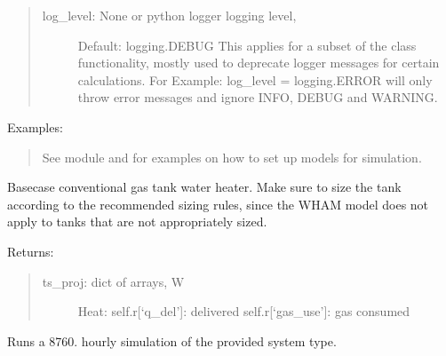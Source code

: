 \documentclass[letterpaper,10pt,english,openany]{sphinxmanual}
\begin{document}
\begin{fulllineitems}
\begin{quote}
\begin{description}
\item[{log\_level: None or python logger logging level,}] \leavevmode
Default: logging.DEBUG
This applies for a subset of the class functionality, mostly
used to deprecate logger messages for certain calculations.
For Example: log\_level = logging.ERROR will only throw error
messages and ignore INFO, DEBUG and WARNING.

\end{description}
\end{quote}

Examples:
\begin{quote}

See  module and
for examples on how to set up models for simulation.
\end{quote}

\begin{fulllineitems}
\label{\detokenize{source/mswh.system:mswh.system.models.System.conventional_gas_tank}}
Basecase conventional gas tank water heater.
Make sure to size the tank according to the recommended
sizing rules, since the WHAM model does not apply to
tanks that are not appropriately sized.

Returns:
\begin{quote}
\begin{description}
\item[{ts\_proj: dict of arrays, W}] \leavevmode
Heat:
self.r{[}‘q\_del’{]}: delivered
self.r{[}‘gas\_use’{]}: gas consumed

\end{description}
\end{quote}

\end{fulllineitems}


\begin{fulllineitems}
\label{\detokenize{source/mswh.system:mswh.system.models.System.simulate}}
Runs a 8760. hourly simulation of the
provided system type.


\end{fulllineitems}
\end{fulllineitems}
\end{document}

